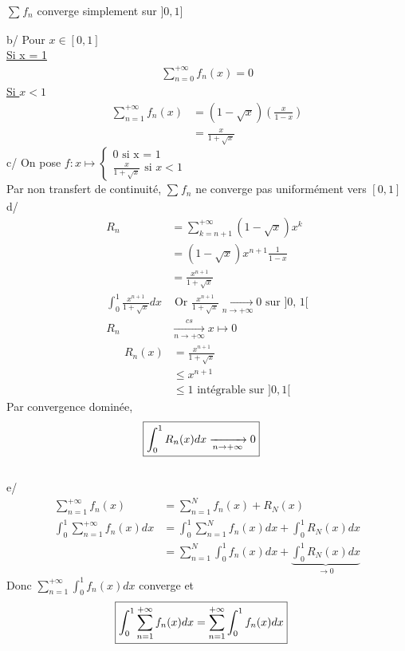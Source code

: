 \documentclass{article}
\begin{document}
\noindent \(\sum_{}^{}f_{n}\) converge simplement sur \(]0, 1]\) 

\noindent b/ Pour \(x \in [0, 1]\)\\
\underline{Si x = 1}
\begin{align*}
    \sum_{n=0}^{+\infty}f_{n}(x) = 0
\end{align*}
\underline{Si \(x < 1\)}
\begin{align*}
  \sum_{n=1}^{+\infty}f_{n}(x) &= (1-\sqrt{x})(\frac{x}{1-x})\\
                               &= \frac{x}{1+\sqrt{x}}
\end{align*}
\noindent
c/ On pose \(f : x \mapsto 
\begin{cases}
  0 \text{ si x = 1}\\ 
  \frac{x}{1+\sqrt{x}} \text{ si } x < 1
\end{cases}
\)\\
Par non transfert de continuité, \(\sum_{}^{}f_{n}\) ne converge
pas uniformément vers \([0, 1]\)\\ 

\noindent
d/
\begin{align*}
  R_{n}&= \sum_{k = n+1}^{+\infty}(1-\sqrt{x})x^{k}\\
       &= (1-\sqrt{x})x^{n+1}\frac{1}{1-x}\\
       &= \frac{x^{n+1}}{1+\sqrt{x}}\\
  \int_{0}^{1}\frac{x^{n+1}}{1+\sqrt{x}}dx &\text{ Or \(\frac{x^{n+1}}{1+\sqrt{x}}\xrightarrow[n\to+\infty]{} 0\) sur ]0, 1[}\\ 
  R_{n}&\xrightarrow[n \to +\infty]{cs} x\mapsto 0
\end{align*}
\begin{align*}
  R_{n}(x) &= \frac{x^{n+1}}{1+\sqrt{x}}\\
           &\leq x^{n+1}\\
           &\leq 1 \text{ intégrable sur \(]0, 1[\)}
\end{align*}
Par convergence dominée, 
\begin{align*}
  \Aboxed{\int_{0}^{1}R_{n}(x)dx \xrightarrow[n \rightarrow +\infty]{} 0} 
\end{align*}\\

\noindent 
e/ 
\begin{align*}
  \sum_{n=1}^{+\infty} f_{n}(x) &= \sum_{n=1}^{N}f_{n}(x) + R_{N}(x)\\
  \int_{0}^{1}\sum_{n=1}^{+\infty}f_{n}(x)dx &= \int_{0}^{1}\sum_{n=1}^{N}f_{n}(x)dx + \int_{0}^{1}R_{N}(x)dx\\
                                             &= \sum_{n=1}^{N}\int_{0}^{1}f_{n}(x)dx + \underbrace{\int_{0}^{1} R_{N}(x)dx}_{\rightarrow 0}
\end{align*}
Donc \(\sum_{n=1}^{+\infty}\int_{0}^{1}f_{n}(x)dx\) converge et \\
\begin{align*}
    \Aboxed{\int_{0}^{1}\sum_{n=1}^{+\infty}f_{n}(x)dx = \sum_{n=1}^{+\infty}\int_{0}^{1}f_{n}(x)dx}
\end{align*}
\end{document}
